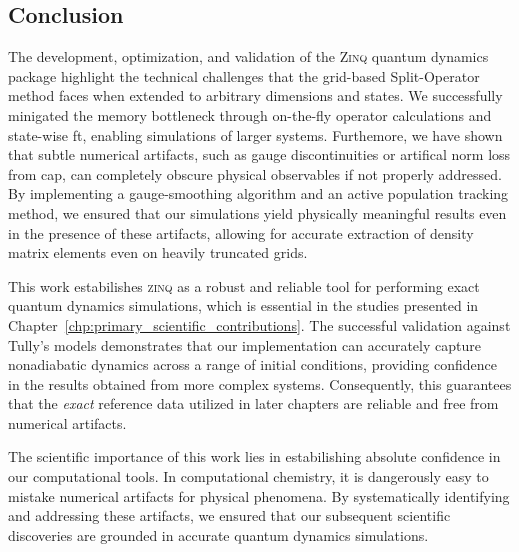 \subsection{Conclusion}
The development, optimization, and validation of the \textsc{Zinq} quantum dynamics package highlight the technical challenges that the grid-based Split-Operator method faces when extended to arbitrary dimensions and states. We successfully minigated the memory bottleneck through on-the-fly operator calculations and state-wise \acrshort{ft}, enabling simulations of larger systems. Furthemore, we have shown that subtle numerical artifacts, such as gauge discontinuities or artifical norm loss from \acrshort{cap}, can completely obscure physical observables if not properly addressed. By implementing a gauge-smoothing algorithm and an active population tracking method, we ensured that our simulations yield physically meaningful results even in the presence of these artifacts, allowing for accurate extraction of density matrix elements even on heavily truncated grids.

This work estabilishes \textsc{zinq} as a robust and reliable tool for performing exact quantum dynamics simulations, which is essential in the studies presented in Chapter~\ref{chp:primary_scientific_contributions}. The successful validation against Tully's models demonstrates that our implementation can accurately capture nonadiabatic dynamics across a range of initial conditions, providing confidence in the results obtained from more complex systems. Consequently, this guarantees that the \textit{exact} reference data utilized in later chapters are reliable and free from numerical artifacts.

The scientific importance of this work lies in estabilishing absolute confidence in our computational tools. In computational chemistry, it is dangerously easy to mistake numerical artifacts for physical phenomena. By systematically identifying and addressing these artifacts, we ensured that our subsequent scientific discoveries are grounded in accurate quantum dynamics simulations.
